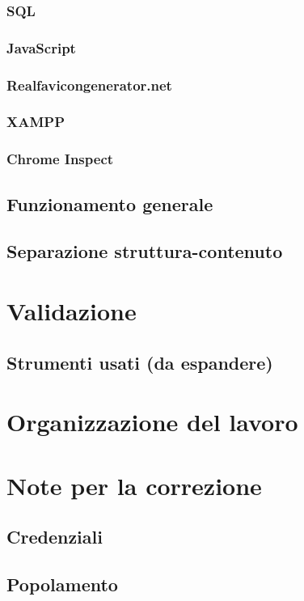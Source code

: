 \documentclass[a4paper, oneside, openany, dvipsnames, table]{article}
\begin{document}
		\subsubsection{SQL}
			
		\subsubsection{JavaScript}
			
		\subsubsection{Realfavicongenerator.net}
			
		\subsubsection{XAMPP}
			
		\subsubsection{Chrome Inspect}
			
	\subsection{Funzionamento generale}
		
	\subsection{Separazione struttura-contenuto}
		
	
\newpage
\section{Validazione}
	
	\subsection{Strumenti usati (da espandere)}
		
	
\newpage
\section{Organizzazione del lavoro}
	
	
\appendix
{}
\newpage
\section{Note per la correzione}
	
	\subsection{Credenziali}
		
	\subsection{Popolamento}
		

\newpage
\end{document}
